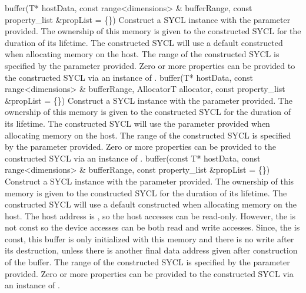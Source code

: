    { buffer(T* hostData,}
   { const range<dimensions> \& bufferRange, }
   { const property_list \&propList = \{\}) }
   {
       Construct a SYCL  instance with the  parameter provided. The ownership of this memory is given to the constructed SYCL  for the duration of its lifetime.
       The constructed SYCL  will use a default constructed  when allocating memory on the host.
        The range of the constructed SYCL  is specified by the  parameter provided.
       Zero or more properties can be provided to the constructed SYCL  via an instance of .
    }
  \addRowFourSL
   { buffer(T* hostData,}
   { const range<dimensions> \& bufferRange, }
   { AllocatorT allocator, }
   { const property_list \&propList = \{\}) }
   {
       Construct a SYCL  instance with the  parameter provided. The ownership of this memory is given to the constructed SYCL  for the duration of its lifetime.
       The constructed SYCL  will use the  parameter provided when allocating memory on the host.
        The range of the constructed SYCL  is specified by the  parameter provided.
       Zero or more properties can be provided to the constructed SYCL  via an instance of .
   }
  \addRowThreeSL
    {  buffer(const T* hostData, }
    {  const range<dimensions> \& bufferRange, }
    {  const property_list \&propList = \{\}) }
    {
       Construct a SYCL  instance with the  parameter provided. The ownership of this memory is given to the constructed SYCL  for the duration of its lifetime.
       The constructed SYCL  will use a default constructed  when allocating memory on the host.
      The host address is , so the host accesses can be read-only. However, the  is not const so the device accesses can be both read and write accesses. Since, the  is const, this buffer is only initialized with this memory and there is no write after its destruction, unless there is another final data address given after construction of the buffer.
        The range of the constructed SYCL  is specified by the  parameter provided.
       Zero or more properties can be provided to the constructed SYCL  via an instance of .
    }
